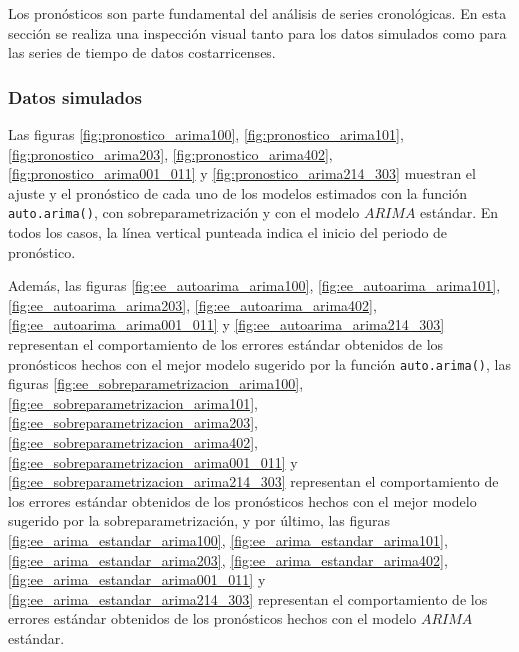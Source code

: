 \documentclass[
]{article}
\begin{document}
Los pronósticos son parte fundamental del análisis de series
cronológicas. En esta sección se realiza una inspección visual tanto
para los datos simulados como para las series de tiempo de datos
costarricenses.

\subsubsection{Datos simulados}

Las figuras \ref{fig:pronostico_arima100},
\ref{fig:pronostico_arima101}, \ref{fig:pronostico_arima203},
\ref{fig:pronostico_arima402}, \ref{fig:pronostico_arima001_011} y
\ref{fig:pronostico_arima214_303} muestran el ajuste y el pronóstico de
cada uno de los modelos estimados con la función \texttt{auto.arima()},
con sobreparametrización y con el modelo \(ARIMA\) estándar. En todos
los casos, la línea vertical punteada indica el inicio del periodo de
pronóstico.

Además, las figuras \ref{fig:ee_autoarima_arima100},
\ref{fig:ee_autoarima_arima101}, \ref{fig:ee_autoarima_arima203},
\ref{fig:ee_autoarima_arima402}, \ref{fig:ee_autoarima_arima001_011} y
\ref{fig:ee_autoarima_arima214_303} representan el comportamiento de los
errores estándar obtenidos de los pronósticos hechos con el mejor modelo
sugerido por la función \texttt{auto.arima()}, las figuras
\ref{fig:ee_sobreparametrizacion_arima100},
\ref{fig:ee_sobreparametrizacion_arima101},
\ref{fig:ee_sobreparametrizacion_arima203},
\ref{fig:ee_sobreparametrizacion_arima402},
\ref{fig:ee_sobreparametrizacion_arima001_011} y
\ref{fig:ee_sobreparametrizacion_arima214_303} representan el
comportamiento de los errores estándar obtenidos de los pronósticos
hechos con el mejor modelo sugerido por la sobreparametrización, y por
último, las figuras \ref{fig:ee_arima_estandar_arima100},
\ref{fig:ee_arima_estandar_arima101},
\ref{fig:ee_arima_estandar_arima203},
\ref{fig:ee_arima_estandar_arima402},
\ref{fig:ee_arima_estandar_arima001_011} y
\ref{fig:ee_arima_estandar_arima214_303} representan el comportamiento
de los errores estándar obtenidos de los pronósticos hechos con el
modelo \(ARIMA\) estándar.
\end{document}
